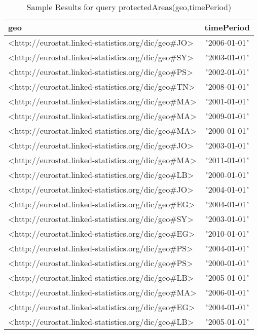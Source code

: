 \documentclass[a4paper,10pt]{article}
\begin{document}
		
\begin{table}[!tb]

\caption{Sample Results for query protectedAreas(geo,timePeriod)}
\begin{center}
\begin{tabular}{l c}

\hline
geo & timePeriod \\ \hline 
 <http://eurostat.linked-statistics.org/dic/geo$\#$JO> & "2006-01-01" \\
 <http://eurostat.linked-statistics.org/dic/geo$\#$SY> & "2003-01-01" \\
 <http://eurostat.linked-statistics.org/dic/geo$\#$PS> & "2002-01-01" \\
 <http://eurostat.linked-statistics.org/dic/geo$\#$TN> & "2008-01-01" \\
<http://eurostat.linked-statistics.org/dic/geo$\#$MA> & "2001-01-01" \\
 <http://eurostat.linked-statistics.org/dic/geo$\#$MA> & "2009-01-01" \\
 <http://eurostat.linked-statistics.org/dic/geo$\#$MA> & "2000-01-01" \\
 <http://eurostat.linked-statistics.org/dic/geo$\#$JO> & "2003-01-01" \\
 <http://eurostat.linked-statistics.org/dic/geo$\#$MA> & "2011-01-01" \\
 <http://eurostat.linked-statistics.org/dic/geo$\#$LB> & "2000-01-01" \\
 <http://eurostat.linked-statistics.org/dic/geo$\#$JO> & "2004-01-01" \\
 <http://eurostat.linked-statistics.org/dic/geo$\#$EG> & "2004-01-01" \\
 <http://eurostat.linked-statistics.org/dic/geo$\#$SY> & "2003-01-01" \\
<http://eurostat.linked-statistics.org/dic/geo$\#$EG> & "2010-01-01" \\
 <http://eurostat.linked-statistics.org/dic/geo$\#$PS> & "2004-01-01" \\
 <http://eurostat.linked-statistics.org/dic/geo$\#$PS> & "2000-01-01" \\
 <http://eurostat.linked-statistics.org/dic/geo$\#$LB> & "2005-01-01" \\
 <http://eurostat.linked-statistics.org/dic/geo$\#$MA> & "2006-01-01" \\
 <http://eurostat.linked-statistics.org/dic/geo$\#$EG> & "2004-01-01" \\
 <http://eurostat.linked-statistics.org/dic/geo$\#$LB> & "2005-01-01" \\

\end{tabular}
\end{center}
\end{table}
\end{document}
